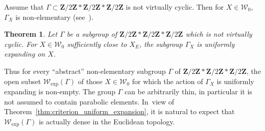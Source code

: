 \documentclass[11pt]{article}
\def\Z{\mathbf{Z}}
\newcommand{\cW}{\mathcal{W}}
\theoremstyle{plain}
\newtheorem{thm}{Theorem}[section]
\theoremstyle{definition}
\numberwithin{equation}{section}
\begin{document}
Assume that $\Gamma\subset \Z/2\Z\ast\Z/2\Z\ast\Z/2\Z$ is not virtually cyclic. Then for $X\in \cW_0$, $\Gamma_X$ is non-elementary (see~\cite[\S 3]{stiffness}).

\begin{thm}\label{thm:thin}
Let $\Gamma$ be a subgroup of $\Z/2\Z\ast\Z/2\Z\ast\Z/2\Z$ which is not virtually cyclic.
For $X\in \cW_0$ sufficiently close to $X_E$, the subgroup $\Gamma_X$ is uniformly expanding on $X$.
\end{thm}

Thus for every ``abstract'' non-elementary subgroup $\Gamma$ of $\Z/2\Z\ast\Z/2\Z\ast\Z/2\Z$, the open
subset $\cW_{\exp}(\Gamma)$ of those $X\in \cW_0$ for which the action of $\Gamma_X$ is uniformly expanding is non-empty.
The group $\Gamma$ can be arbitrarily thin, in particular it is not assumed to contain parabolic elements. In~view of Theorem~\ref{thm:criterion_uniform_expansion}, it is natural to expect that $\cW_{\exp}(\Gamma)$ is actually dense in the Euclidean topology.
\end{document}
